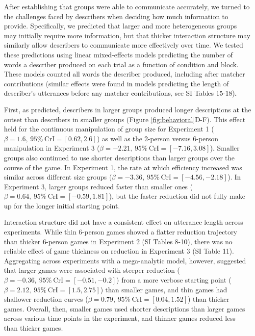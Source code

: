 \documentclass[
  english,
]{article}
\begin{document}
After establishing that groups were able to communicate accurately, we turned to the challenges faced by describers when deciding how much information to provide.
Specifically, we predicted that larger and more heterogeneous groups may initially require more information, but that thicker interaction structure may similarly allow describers to communicate more effectively over time.
We tested these predictions using linear mixed-effects models predicting the number of words a describer produced on each trial as a function of condition and block.
These models counted all words the describer produced, including after matcher contributions (similar effects were found in models predicting the length of describer's utterances before any matcher contributions, see SI Tables 15-18).

First, as predicted, describers in larger groups produced longer descriptions at the outset than describers in smaller groups (Figure \ref{fig:behavioral}D-F).
This effect held for the continuous manipulation of group size for Experiment 1 (\(\beta=1.6,\:95\%\:\mathrm{CrI}=[0.62, 2.6]\)) as well as the 2-person versus 6-person manipulation in Experiment 3 (\(\beta=-2.21,\:95\%\:\mathrm{CrI}=[-7.16, 3.08]\)).
Smaller groups also continued to use shorter descriptions than larger groups over the course of the game.
In Experiment 1, the rate at which efficiency increased was similar across different size groups (\(\beta=-3.36,\:95\%\:\mathrm{CrI}=[-4.56, -2.18]\)).
In Experiment 3, larger groups reduced faster than smaller ones (\(\beta=0.64,\:95\%\:\mathrm{CrI}=[-0.59, 1.81]\)), but the faster reduction did not fully make up for the longer initial starting point.

Interaction structure did not have a consistent effect on utterance length across experiments.
While thin 6-person games showed a flatter reduction trajectory than thicker 6-person games in Experiment 2 (SI Tables 8-10), there was no reliable effect of game thickness on reduction in Experiment 3 (SI Table 11).
Aggregating across experiments with a mega-analytic model, however, suggested that larger games were associated with steeper reduction (\(\beta=-0.36,\:95\%\:\mathrm{CrI}=[-0.51, -0.2]\)) from a more verbose starting point (\(\beta=2.12,\:95\%\:\mathrm{CrI}=[1.5, 2.75]\)) than smaller games, and thin games had shallower reduction curves (\(\beta=0.79,\:95\%\:\mathrm{CrI}=[0.04, 1.52]\)) than thicker games.
Overall, then, smaller games used shorter descriptions than larger games across various time points in the experiment, and thinner games reduced less than thicker games.
\end{document}
